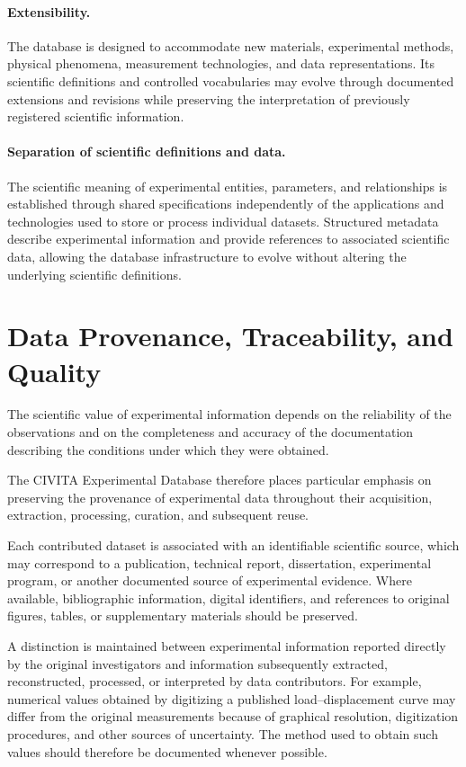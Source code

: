 \paragraph{Extensibility.}

The database is designed to accommodate new materials,
experimental methods, physical phenomena, measurement
technologies, and data representations. Its scientific
definitions and controlled vocabularies may evolve
through documented extensions and revisions while
preserving the interpretation of previously registered
scientific information.

\paragraph{Separation of scientific definitions and data.}

The scientific meaning of experimental entities,
parameters, and relationships is established through
shared specifications independently of the applications
and technologies used to store or process individual
datasets. Structured metadata describe experimental
information and provide references to associated
scientific data, allowing the database infrastructure
to evolve without altering the underlying scientific
definitions.


\section{Data Provenance, Traceability, and Quality}

The scientific value of experimental information depends
on the reliability of the observations and on the
completeness and accuracy of the documentation describing
the conditions under which they were obtained.

The CIVITA Experimental Database therefore places particular
emphasis on preserving the provenance of experimental
data throughout their acquisition, extraction, processing,
curation, and subsequent reuse.

Each contributed dataset is associated with an identifiable
scientific source, which may correspond to a publication,
technical report, dissertation, experimental program,
or another documented source of experimental evidence.
Where available, bibliographic information, digital
identifiers, and references to original figures, tables,
or supplementary materials should be preserved.

A distinction is maintained between experimental information
reported directly by the original investigators and
information subsequently extracted, reconstructed,
processed, or interpreted by data contributors. For
example, numerical values obtained by digitizing a
published load--displacement curve may differ from
the original measurements because of graphical resolution,
digitization procedures, and other sources of uncertainty.
The method used to obtain such values should therefore
be documented whenever possible.

